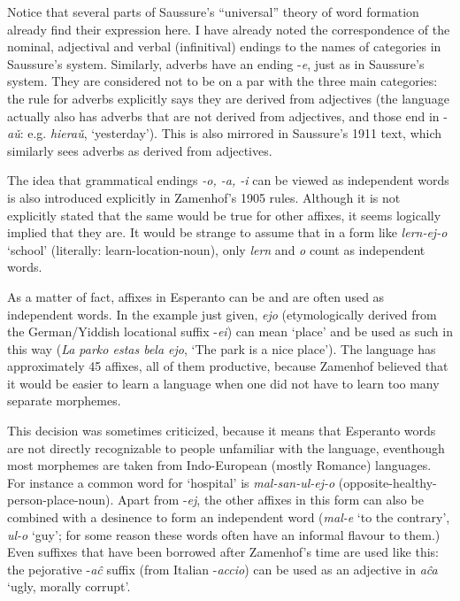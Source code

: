 \documentclass[output=paper]{langsci/langscibook}
\begin{document}
Notice that several parts of Saussure's ``universal'' theory of word
formation already find their expression here. I have already noted the
correspondence of the nominal, adjectival and verbal (infinitival)
endings to the names of categories in Saussure's system. Similarly,
adverbs have an ending -\emph{e}, just as in Saussure's system. They
are considered not to be on a par with the three main categories: the
rule for adverbs explicitly says they are derived from adjectives (the
language actually also has adverbs that are not derived from
adjectives, and those end in -\emph{a\v{u}}: e.g. \emph{hiera\v{u}},
`yesterday'). This is also mirrored in Saussure's 1911 text, which
similarly sees adverbs as derived from adjectives.

The idea that grammatical endings \emph{-o, -a, -i} can be viewed as
independent words is also introduced explicitly in Zamenhof's 1905
rules. Although it is not explicitly stated that the same would be
true for other affixes, it seems logically implied that they are. It
would be strange to assume that in a form like \emph{lern-ej-o}
`school' (literally: learn-location-noun), only \emph{lern} and
\emph{o} count as independent words.

As a matter of fact, affixes in Esperanto can be and are often used as
independent words. In the example just given, \emph{ejo}
(etymologically derived from the German/Yiddish locational suffix
-\emph{ei}) can mean `place' and be used as such in this way (\emph{La
  parko estas bela ejo}, `The park is a nice place'). The language has
approximately 45 affixes, all of them productive, because Zamenhof
believed that it would be easier to learn a language when one did not
have to learn too many separate morphemes.

This decision was sometimes criticized, because it means that
Esperanto words are not directly recognizable to people unfamiliar
with the language, even\linebreak though most morphemes are taken from
Indo-European (mostly Romance) languages. For instance a common word
for `hospital' is \emph{mal-san-ul-ej-o}
(opposite-healthy-person-place-noun). Apart from -\emph{ej}, the other
affixes in this form can also be combined with a desinence to form an
independent word (\emph{mal-e} `to the contrary', \emph{ul-o} `guy';
for some reason these words often have an informal flavour to them.)
Even suffixes that have been borrowed after Zamenhof's time are used
like this: the pejorative -\emph{a\^c} suffix (from Italian
-\emph{accio}) can be used as an adjective in \emph{a\^ca} `ugly,
morally corrupt'.
\end{document}

